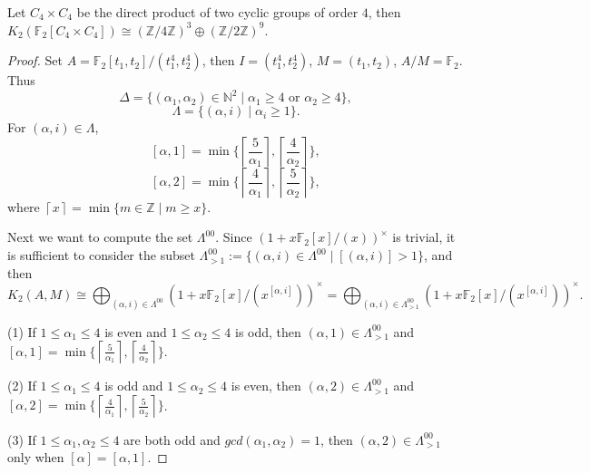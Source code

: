 \begin{theorem}
	Let $C_4\times C_4$ be the direct product of two cyclic groups of order $4$, then $K_2(\mathbb{F}_2[C_4\times C_4])  \cong (\mathbb{Z}/4 \mathbb{Z})^3 \oplus (\mathbb{Z}/2 \mathbb{Z})^9$.
\end{theorem}
\begin{proof}
	Set $A=\mathbb{F}_2[t_1,t_2]/(t_1^4,t_2^4)$, then $I=(t_1^4,t_2^4)$, $M=(t_1,t_2)$, $A/M=\mathbb{F}_2$. Thus 
	\[\Delta =\{(\alpha_1,\alpha_2)\in\mathbb{N}^2\mid  \alpha_1 \geq 4 \text{ or } \alpha_2 \geq 4\},\] 
	\[\Lambda =\{(\alpha,i)\mid \alpha_i \geq 1\}.\]
	For $(\alpha,i)\in \Lambda$, 
	\[ [\alpha,1]=\min\{\left \lceil \frac{5}{\alpha_1} \right \rceil, \left \lceil \frac{4}{\alpha_2} \right \rceil \}, \]
	\[ [\alpha,2]=\min\{\left \lceil \frac{4}{\alpha_1} \right \rceil, \left \lceil \frac{5}{\alpha_2} \right \rceil \},\]
	where $\left \lceil x \right \rceil=\min \{m\in \mathbb{Z}\mid m\geq x\}$.

	Next we want to compute the set $\Lambda^{00}$. Since $(1+x\mathbb{F}_2[x]/(x))^{\times}$ is trivial, it is sufficient to consider the subset $\Lambda^{00}_{>1}:=\{(\alpha,i)\in \Lambda^{00}\mid [(\alpha,i)]>1\}$, and then 
	\[K_2(A,M)\cong \bigoplus_{(\alpha,i)\in\Lambda^{00}}(1+x \mathbb{F}_2[x]/(x^{[\alpha,i]}))^{\times} = \bigoplus_{(\alpha,i)\in\Lambda^{00}_{>1}}(1+x \mathbb{F}_2[x]/(x^{[\alpha,i]}))^{\times}.\]

	(1) If $1\leq \alpha_1 \leq 4$ is even and $1\leq \alpha_2 \leq 4$ is odd, then $(\alpha,1)\in \Lambda^{00}_{>1}$ and $[\alpha,1]=\min\{\left \lceil \frac{5}{\alpha_1} \right \rceil, \left \lceil \frac{4}{\alpha_2} \right \rceil \}$.

	(2) If $1\leq \alpha_1 \leq 4$ is odd and $1\leq \alpha_2 \leq 4$ is even, then $(\alpha,2)\in \Lambda^{00}_{>1}$ and $[\alpha,2]=\min\{\left \lceil \frac{4}{\alpha_1} \right \rceil, \left \lceil \frac{5}{\alpha_2} \right \rceil \}$. 

	(3) If $1\leq \alpha_1,\alpha_2 \leq 4$ are both odd and $gcd(\alpha_1,\alpha_2)=1$, then $(\alpha,2)\in \Lambda^{00}_{>1}$ only when $[\alpha]=[\alpha,1]$.


\end{proof}
